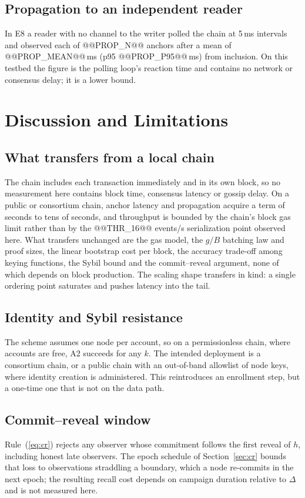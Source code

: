 \documentclass[conference]{IEEEtran}
\begin{document}
\subsection{Propagation to an independent reader}
In E8 a reader with no channel to the writer polled the chain at 5\,ms intervals and observed each of @@PROP_N@@ anchors after a mean of @@PROP_MEAN@@\,ms (p95 @@PROP_P95@@\,ms) from inclusion. On this testbed the figure is the polling loop's reaction time and contains no network or consensus delay; it is a lower bound.

\section{Discussion and Limitations}
\label{sec:discussion}

\subsection{What transfers from a local chain}
\label{sec:transfer}
The chain includes each transaction immediately and in its own block, so no measurement here contains block time, consensus latency or gossip delay. On a public or consortium chain, anchor latency and propagation acquire a term of seconds to tens of seconds, and throughput is bounded by the chain's block gas limit rather than by the @@THR_16@@ events/s serialization point observed here. What transfers unchanged are the gas model, the $g/B$ batching law and proof sizes, the linear bootstrap cost per block, the accuracy trade-off among keying functions, the Sybil bound and the commit--reveal argument, none of which depends on block production. The scaling shape transfers in kind: a single ordering point saturates and pushes latency into the tail.

\subsection{Identity and Sybil resistance}
The scheme assumes one node per account, so on a permissionless chain, where accounts are free, A2 succeeds for any $k$. The intended deployment is a consortium chain, or a public chain with an out-of-band allowlist of node keys, where identity creation is administered. This reintroduces an enrollment step, but a one-time one that is not on the data path.

\subsection{Commit--reveal window}
\label{sec:cr-window}
Rule~(\ref{eq:cr}) rejects any observer whose commitment follows the first reveal of $h$, including honest late observers. The epoch schedule of Section~\ref{sec:cr} bounds that loss to observations straddling a boundary, which a node re-commits in the next epoch; the resulting recall cost depends on campaign duration relative to $\Delta$ and is not measured here.
\end{document}
